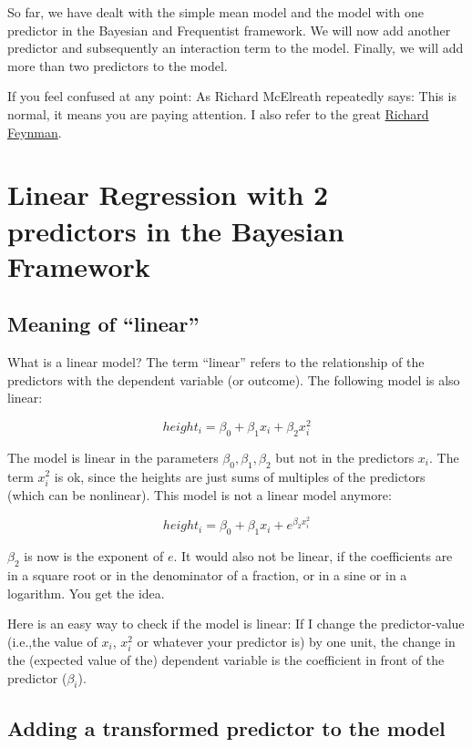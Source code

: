 \documentclass[
]{book}
\begin{document}
So far, we have dealt with the simple mean model and the model with one predictor
in the Bayesian and Frequentist framework.
We will now add another predictor and subsequently an interaction term to the model.
Finally, we will add more than two predictors to the model.

If you feel confused at any point: As Richard McElreath repeatedly says:
This is normal, it means you are paying attention. I also refer to the
great \href{https://www.youtube.com/watch?v=lytxafTXg6c&ab_channel=sdfhsfh}{Richard Feynman}.

\section{Linear Regression with 2 predictors in the Bayesian Framework}\label{linear-regression-with-2-predictors-in-the-bayesian-framework}

\subsection{Meaning of ``linear''}\label{meaning-of-linear}

What is a linear model? The term ``linear'' refers to the relationship of the predictors
with the dependent variable (or outcome). The following model is also linear:

\[height_i = \beta_0 + \beta_1 x_i + \beta_2 x_i^2\]

The model is linear in the parameters \(\beta_0, \beta_1, \beta_2\) but not in the predictors \(x_i\).
The term \(x_i^2\) is ok, since the heights are just sums of multiples of the predictors (which can be nonlinear).
This model is not a linear model anymore:

\[height_i = \beta_0 + \beta_1 x_i + e^{\beta_2 x_i^2}\]

\(\beta_2\) is now is the exponent of \(e\). It would also not be linear,
if the coefficients are in a square root or in the denominator of a fraction,
or in a sine or in a logarithm. You get the idea.

Here is an easy way to check if the model is linear: If I change the predictor-value
(i.e.,the value of \(x_i\), \(x_i^2\) or whatever your predictor is) by one unit,
the change in the (expected value of the) dependent variable is the coefficient in front of
the predictor (\(\beta_i\)).

\subsection{Adding a transformed predictor to the model}\label{adding_transformed_predictor_bayes}
\end{document}
